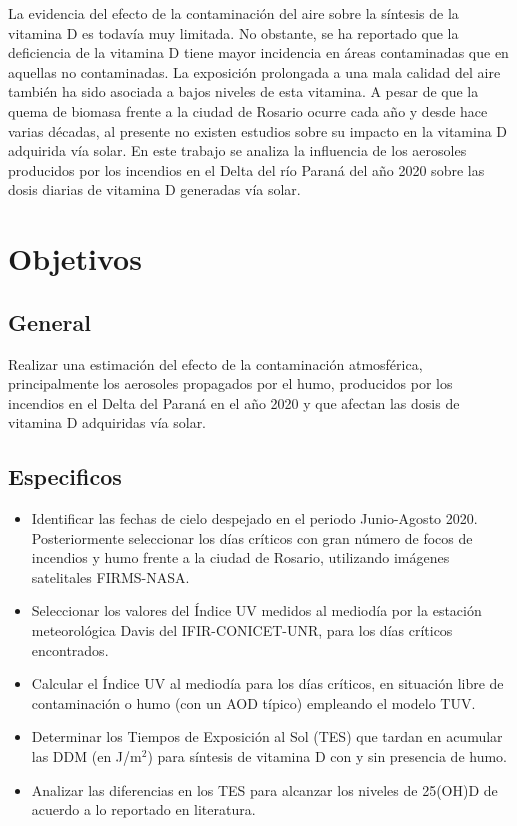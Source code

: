 La evidencia del efecto de la contaminación del aire sobre la síntesis de la vitamina D es todavía muy limitada. No obstante, se ha reportado que la deficiencia de la vitamina D tiene mayor incidencia en áreas contaminadas que en aquellas no contaminadas\cite{Feizabad_2017}. La exposición prolongada a una mala calidad del aire también ha sido asociada a bajos niveles de esta vitamina\cite{Chenlu_2021}. A pesar de que la quema de biomasa frente a la ciudad de Rosario ocurre cada año y desde hace varias décadas, al presente no existen estudios sobre su impacto en la vitamina D adquirida vía solar. En este trabajo se analiza la influencia de los aerosoles producidos por los incendios en el Delta del río Paraná del año 2020 sobre las dosis diarias de vitamina D generadas vía solar.

\section*{Objetivos}

\subsection*{General}

Realizar una estimación del efecto de la contaminación atmosférica, principalmente los aerosoles propagados por el humo, producidos por los incendios en el Delta del Paraná en el año 2020 y que afectan las dosis de vitamina D adquiridas vía solar.

\subsection*{Especificos}

\begin{itemize}
    \item Identificar las fechas de cielo despejado en el periodo Junio-Agosto 2020. Posteriormente seleccionar los días críticos con gran número de focos de incendios y humo frente a la ciudad de Rosario, utilizando imágenes satelitales FIRMS-NASA.

    \item Seleccionar los valores del Índice UV medidos al mediodía por la estación meteorológica Davis del IFIR-CONICET-UNR, para los días críticos encontrados.

    \item Calcular el Índice UV al mediodía para los días críticos, en situación libre de contaminación o humo (con un AOD típico) empleando el modelo TUV.

    \item Determinar los Tiempos de Exposición al Sol (TES) que tardan en acumular las DDM (en J/m$^2$) para síntesis de vitamina D con y sin presencia de humo.

    \item Analizar las diferencias en los TES para alcanzar los niveles de 25(OH)D de acuerdo a lo reportado en literatura\cite{Rodriguez_2011}.
\end{itemize}

